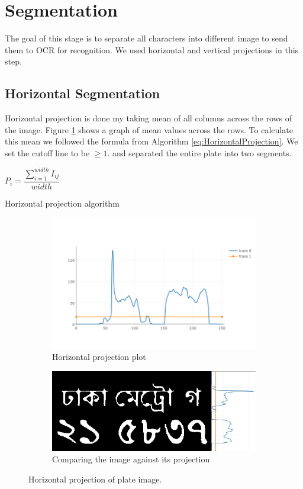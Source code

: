 \documentclass{standalone}
\begin{document}
\section{Segmentation}
The goal of this stage is to separate all characters into different image to send them to OCR for recognition. We used horizontal and vertical projections in this step.


\subsection{Horizontal Segmentation}
Horizontal projection is done my taking mean of all columns across the rows of the image. Figure \ref{fig:HorizontalProjection} shows a graph of mean values across the rows. To calculate this mean we followed the formula from Algorithm \ref{eq:HorizontalProjection}. We set the cutoff line to be $\geq 1$. and separated the entire plate into two segments. 

\begin{algorithm}
  \begin{algorithmic}
        \State $P_i = \dfrac{ \sum^{width}_{i=1}{ I_{ij} } }{ width }$
    \EndFor
  \end{algorithmic}
  \caption{Horizontal projection algorithm}
  \label{eq:HorizontalProjection}
\end{algorithm}

\begin{figure}
\centering
\begin{subfigure}{0.8\textwidth}
  \centering
  \includegraphics[width=0.8\linewidth]{./img/plots/horizontal-1}
  \caption{Horizontal projection plot}
\end{subfigure}
\begin{subfigure}{0.8\textwidth}
  \centering
  \includegraphics[width=0.8\linewidth]{./img/plots/horizontal-2}
  \caption{Comparing the image against its projection}
\end{subfigure}
\caption{Horizontal projection of plate image.}
\label{fig:HorizontalProjection}
\end{figure}
\end{document}
